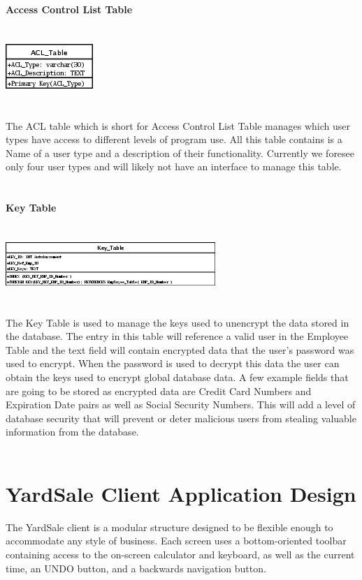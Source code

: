 \documentclass{report}
\begin{document}
\begin{itemize}
        {\bf Access Control List Table}\\
        \\
        \\
        \includegraphics{Tables/ACL.png}\\
        \\
        \\
        The ACL table which is short for Access Control List Table manages which user types have access
        to different levels of program use. All this table contains is a Name of a user type and a description
        of their functionality. Currently we foresee only four user types and will likely not have an
        interface to manage this table.\\
        \\
        \\
        {\bf Key Table}\\
        \\
        \\
        \includegraphics{Tables/KeyTable.png}\\
        \\
        \\
        The Key Table is used to manage the keys used to unencrypt the data stored in the database. The
        entry in this table will reference a valid user in the Employee Table and the text field will
        contain encrypted data that the user's password was used to encrypt. When the password is used
        to decrypt this data the user can obtain the keys used to encrypt global database data. A few
        example fields that are going to be stored as encrypted data are Credit Card Numbers and Expiration
        Date pairs as well as Social Security Numbers. This will add a level of database security that
        will prevent or deter malicious users from stealing valuable information from the database.\\
        \\

    \newpage

    \section{YardSale Client Application Design}
    The YardSale client is a modular structure designed to
    be flexible enough to accommodate any style of business.
    Each screen uses a bottom-oriented toolbar containing access
    to the on-screen calculator and keyboard, as well as the
    current time, an UNDO button, and a backwards navigation
    button.\\

\end{itemize}
\end{document}
